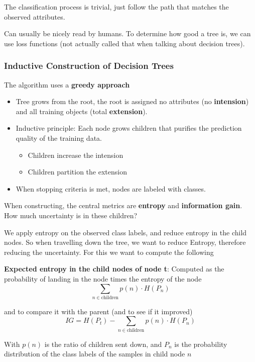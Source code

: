 \documentclass{article}
\begin{document}
The classification process is trivial, just follow the path that matches the observed attributes. 


Can usually be nicely read by humans. To determine how good a tree is, we can use loss functions (not actually called that when talking about decision trees).

\subsubsection{Inductive Construction of Decision Trees}
The algorithm uses a \textbf{greedy approach}
\begin{itemize}
  \item Tree grows from the root, the root is assigned no attributes (no \textbf{intension}) and all training objects (total \textbf{extension}).
  \item Inductive principle: Each node grows children that purifies the prediction quality of the training data.
  \begin{itemize}
    \item Children increase the intension
    \item Children partition the extension
  \end{itemize}
  \item When stopping criteria is met, nodes are labeled with classes.
\end{itemize}

When constructing, the central metrics are \textbf{entropy} and \textbf{information gain}. How much uncertainty is in these children?

We apply entropy on the observed class labels, and reduce entropy in the child nodes. So when travelling down the tree, we want to reduce Entropy, therefore reducing the uncertainty. For this we want to compute the following

\textbf{Expected entropy in the child nodes of node t}: Computed as the probability of landing in the node times the entropy of the node
\[\sum_{n\in \text{children}} p(n) \cdot H(P_n)\]


and to compare it with the parent (and to see if it improved)
\[IG = H(P_t) - \sum_{n\in \text{children}} p(n) \cdot H(P_n)\]

With $p(n)$ is the ratio of children sent down, and $P_n$ is the probability distribution of the class labels of the samples in child node $n$
\end{document}
